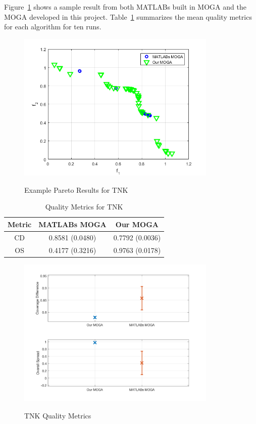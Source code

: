 \documentclass{article}
\begin{document}
\noindent Figure~\ref{fig:TNK} shows a sample result from both MATLABs built in MOGA and the MOGA developed in this project. Table~\ref{tab:TNK} summarizes the mean quality metrics for each algorithm for ten runs.
\begin{figure}[H]
  \caption{Example Pareto Results for TNK}
  \centering
  \includegraphics[width=0.85\textwidth]{TNK_pareto_final.png}  
  \label{fig:TNK}
\end{figure}

\begin{table}[H]
\caption{Quality Metrics for TNK} 
\centering 
\begin{tabular}{|c|c|c|} 
\hline
Metric & MATLABs MOGA & Our MOGA \\ \hline
CD &  0.8581 (0.0480) & 0.7792 (0.0036) \\ \hline
OS & 0.4177 (0.3216) & 0.9763 (0.0178)\\ \hline
\end{tabular}
\label{tab:TNK} 
\end{table}
\begin{figure}[H]
  \caption{TNK Quality Metrics}
  \centering
  \includegraphics[width=0.85\textwidth]{TNK_QM.png}  
  \label{fig:TNK_QM}
\end{figure}
 
\end{document}
